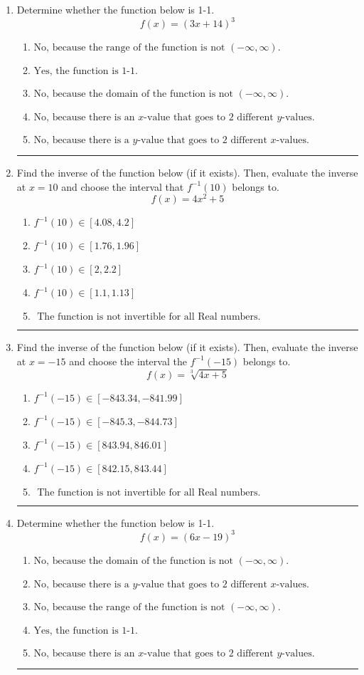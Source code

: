 \documentclass[14pt]{extbook}
\newcommand{\litem}[1]{\item#1\hspace*{-1cm}\rule{\textwidth}{0.4pt}}
\begin{document}
\begin{enumerate}
{\begin{enumerate}[label=\Alph*.]
\end{enumerate} }
\litem{
Determine whether the function below is 1-1.\[ f(x) = (3 x + 14)^3 \]\begin{enumerate}[label=\Alph*.]
\item \( \text{No, because the range of the function is not $(-\infty, \infty)$.} \)
\item \( \text{Yes, the function is 1-1.} \)
\item \( \text{No, because the domain of the function is not $(-\infty, \infty)$.} \)
\item \( \text{No, because there is an $x$-value that goes to 2 different $y$-values.} \)
\item \( \text{No, because there is a $y$-value that goes to 2 different $x$-values.} \)

\end{enumerate} }
\litem{
Find the inverse of the function below (if it exists). Then, evaluate the inverse at $x = 10$ and choose the interval that $f^{-1}(10)$ belongs to.\[ f(x) = 4 x^2 + 5 \]\begin{enumerate}[label=\Alph*.]
\item \( f^{-1}(10) \in [4.08, 4.2] \)
\item \( f^{-1}(10) \in [1.76, 1.96] \)
\item \( f^{-1}(10) \in [2, 2.2] \)
\item \( f^{-1}(10) \in [1.1, 1.13] \)
\item \( \text{ The function is not invertible for all Real numbers. } \)

\end{enumerate} }
\litem{
Find the inverse of the function below (if it exists). Then, evaluate the inverse at $x = -15$ and choose the interval the $f^{-1}(-15)$ belongs to.\[ f(x) = \sqrt[3]{4 x + 5} \]\begin{enumerate}[label=\Alph*.]
\item \( f^{-1}(-15) \in [-843.34, -841.99] \)
\item \( f^{-1}(-15) \in [-845.3, -844.73] \)
\item \( f^{-1}(-15) \in [843.94, 846.01] \)
\item \( f^{-1}(-15) \in [842.15, 843.44] \)
\item \( \text{ The function is not invertible for all Real numbers. } \)

\end{enumerate} }
\litem{
Determine whether the function below is 1-1.\[ f(x) = (6 x - 19)^3 \]\begin{enumerate}[label=\Alph*.]
\item \( \text{No, because the domain of the function is not $(-\infty, \infty)$.} \)
\item \( \text{No, because there is a $y$-value that goes to 2 different $x$-values.} \)
\item \( \text{No, because the range of the function is not $(-\infty, \infty)$.} \)
\item \( \text{Yes, the function is 1-1.} \)
\item \( \text{No, because there is an $x$-value that goes to 2 different $y$-values.} \)


\end{enumerate}}
\end{enumerate}
\end{document}
